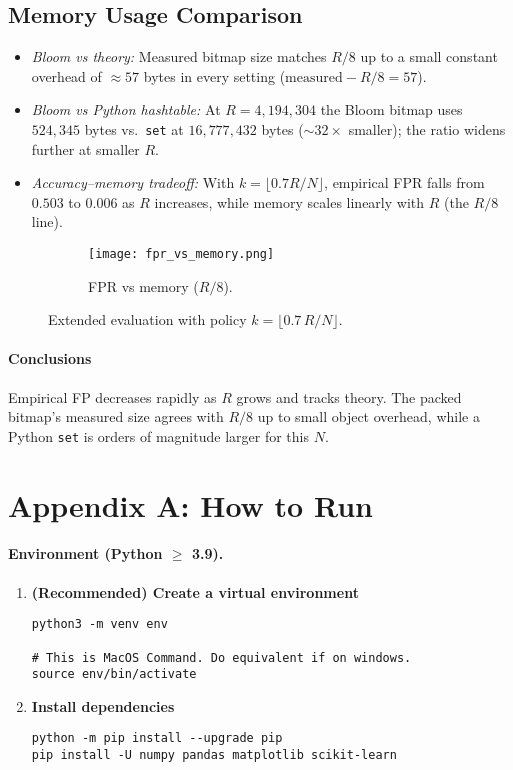 \documentclass[11pt]{article}
\begin{document}
\subsection*{Memory Usage Comparison}
\begin{itemize}
  \item \emph{Bloom vs theory:} Measured bitmap size matches $R/8$ up to a small constant overhead of $\approx57$ bytes in every setting ($\text{measured} - R/8 = 57$).
  \item \emph{Bloom vs Python hashtable:} At $R{=}4{,}194{,}304$ the Bloom bitmap uses $524{,}345$ bytes vs.\ \texttt{set} at $16{,}777{,}432$ bytes ($\sim32\times$ smaller); the ratio widens further at smaller $R$.
  \item \emph{Accuracy--memory tradeoff:} With $k=\lfloor 0.7R/N\rfloor$, empirical FPR falls from $0.503$ to $0.006$ as $R$ increases, while memory scales linearly with $R$ (the $R/8$ line).
\end{itemize}

\begin{figure}[h]
  \centering
  \begin{subfigure}[b]{0.32\linewidth}
    \texttt{[image: fpr\_vs\_memory.png]}
    \caption{FPR vs memory ($R/8$).}
  \end{subfigure}
  \caption{Extended evaluation with policy $k=\lfloor 0.7\,R/N\rfloor$.}
\end{figure}


\paragraph{Conclusions}
Empirical FP decreases rapidly as $R$ grows and tracks theory. The packed bitmap’s measured size agrees with $R/8$ up to small object overhead, while a Python \texttt{set} is orders of magnitude larger for this $N$.

\newpage

\section*{Appendix A: How to Run}

\paragraph{Environment (Python \texorpdfstring{$\ge$}{≥} 3.9).}
\begin{enumerate}
  \item \textbf{(Recommended) Create a virtual environment}
\begin{verbatim}
python3 -m venv env

# This is MacOS Command. Do equivalent if on windows.
source env/bin/activate
\end{verbatim}

  \item \textbf{Install dependencies}
\begin{verbatim}
python -m pip install --upgrade pip
pip install -U numpy pandas matplotlib scikit-learn
\end{verbatim}
\end{enumerate}
\end{document}
